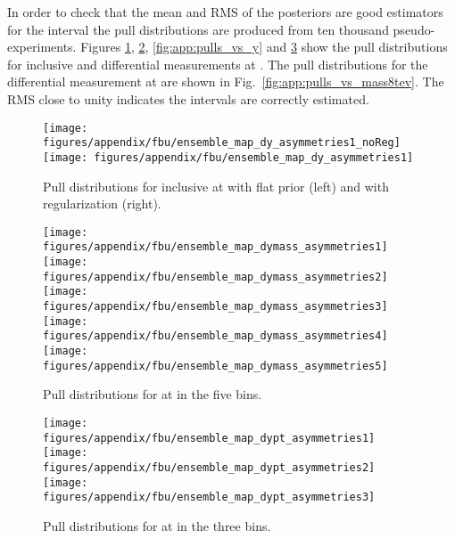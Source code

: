 In order to check that the mean and RMS of the \ac{} posteriors are
good estimators for the \ac{} interval the pull distributions are
produced from ten thousand pseudo-experiments.
Figures \ref{fig:app:pulls_inclu}, \ref{fig:app:pulls_vs_mass},
\ref{fig:app:pulls_vs_y} and \ref{fig:app:pulls_vs_pt} show the pull
distributions for inclusive and differential measurements at \seventev{}.
The pull distributions for the differential measurement at \eighttev{}
are shown in Fig.~\ref{fig:app:pulls_vs_mass8tev}.
The RMS close to unity indicates the intervals are correctly estimated.

\begin{figure}
  \begin{center}
  \texttt{[image: figures/appendix/fbu/ensemble\_map\_dy\_asymmetries1\_noReg]}
  \texttt{[image: figures/appendix/fbu/ensemble\_map\_dy\_asymmetries1]}
  \caption{
    \label{fig:app:pulls_inclu}
    Pull distributions for inclusive \ac{} at \seventev{} with flat prior (left) and with regularization (right).
  }
  \end{center}
\end{figure}

\begin{figure}
  \begin{center}
  \texttt{[image: figures/appendix/fbu/ensemble\_map\_dymass\_asymmetries1]}
  \texttt{[image: figures/appendix/fbu/ensemble\_map\_dymass\_asymmetries2]}
  \texttt{[image: figures/appendix/fbu/ensemble\_map\_dymass\_asymmetries3]}
  \texttt{[image: figures/appendix/fbu/ensemble\_map\_dymass\_asymmetries4]}
  \texttt{[image: figures/appendix/fbu/ensemble\_map\_dymass\_asymmetries5]}
  \caption{
    \label{fig:app:pulls_vs_mass}
    Pull distributions for \ac{} at \seventev{} in the five \mtt{} bins.
  }
  \end{center}
\end{figure}

\begin{figure}
  \begin{center}
  \texttt{[image: figures/appendix/fbu/ensemble\_map\_dypt\_asymmetries1]}
  \texttt{[image: figures/appendix/fbu/ensemble\_map\_dypt\_asymmetries2]}
  \texttt{[image: figures/appendix/fbu/ensemble\_map\_dypt\_asymmetries3]}
  \caption{
    \label{fig:app:pulls_vs_pt}
    Pull distributions for \ac{} at \seventev{} in the three \pttt{} bins.
  }
  \end{center}
\end{figure}


